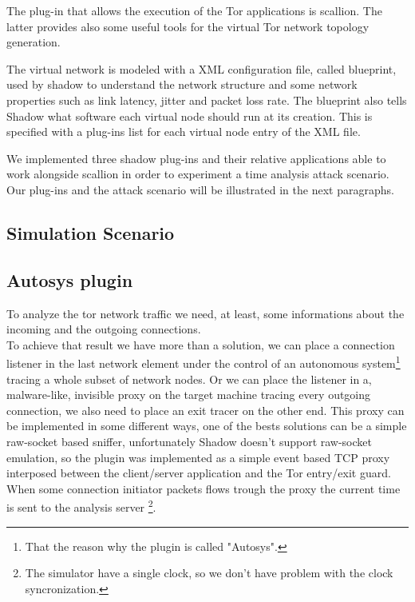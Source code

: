The plug-in that allows the execution of the Tor applications is
scallion. The latter provides also some useful tools for the virtual
Tor network topology generation.

The virtual network is modeled with a XML configuration
file, called blueprint, used by shadow to understand the network
structure and some network properties such as link latency, jitter and
packet loss rate. The blueprint also tells Shadow what software each
virtual node should run at its creation. This is specified with a
plug-ins list for each virtual node entry of the XML file.

We implemented three shadow plug-ins and their relative applications 
 able to work alongside scallion in
order to experiment a time analysis attack scenario. Our plug-ins and
the attack scenario will be illustrated in the next paragraphs.

\subsection{Simulation Scenario}

\subsection{Autosys plugin}
To analyze the tor network traffic we need, at least, some informations about
the incoming and the outgoing connections.\\
To achieve that result we have more than a solution, we can place a connection
listener in the last network element under the control of an autonomous system\footnote{
That the reason why the plugin is called "Autosys".} tracing a whole subset of
network nodes.
Or we can place the listener in a, malware-like, invisible proxy on the target
machine tracing every outgoing connection, we also need to place an exit tracer on the other end.
This proxy can be implemented in some different ways, one of the bests solutions can be
a simple raw-socket based sniffer, unfortunately Shadow doesn't support raw-socket
emulation, so the plugin was implemented as a simple event based TCP proxy interposed
between the client/server application and the Tor entry/exit guard.
\\

When some connection initiator packets flows trough the proxy the current time
is sent to the analysis server
\footnote{The simulator have a single clock, so we don't have problem with the
clock syncronization.}.


